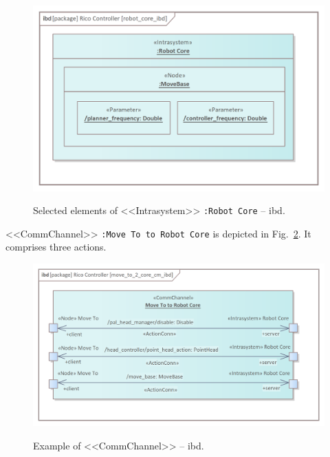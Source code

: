 \documentclass[11pt,oneside,a4paper]{article}
\begin{document}
	\begin{figure}[H]
		\centering
		\begin{center}
			{\includegraphics[scale=1.0]{img/rico_pkg/robot_core_ibd.png}}
		\end{center}
		\caption{Selected elements of <<Intrasystem>> \texttt{:Robot Core} -- ibd.} 
		\label{fig:robot_core_ibd}
	\end{figure}
	
			
	<<CommChannel>> \texttt{:Move To to Robot Core} is depicted in Fig.~\ref{fig:move_to_2_core_cm_ibd}. It comprises three actions.
	

	\begin{figure}[H]
		\centering
		\begin{center}
			{\includegraphics[scale=1.0]{img/rico_pkg/move_to_2_core_cm_ibd.png}}
		\end{center}
		\caption{Example of <<CommChannel>> -- ibd.} 
		\label{fig:move_to_2_core_cm_ibd}
	\end{figure}
	
	
	\pagebreak
	
\end{document}
